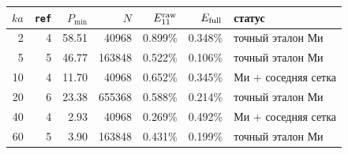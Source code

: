 \begin{tabular}{rrrrrrl}
\toprule
$ka$ & \texttt{ref} & $P_{\min}$ & $N$ & $E_{11}^{\rm raw}$ & $E_{\rm full}$ & статус\\
\midrule
2 & 4 & 58.51 & 40968 & 0.899\% & 0.348\% & точный эталон Ми\\
5 & 5 & 46.77 & 163848 & 0.522\% & 0.106\% & точный эталон Ми\\
10 & 4 & 11.70 & 40968 & 0.652\% & 0.345\% & Ми + соседняя сетка\\
20 & 6 & 23.38 & 655368 & 0.588\% & 0.214\% & точный эталон Ми\\
40 & 4 & 2.93 & 40968 & 0.269\% & 0.492\% & Ми + соседняя сетка\\
60 & 5 & 3.90 & 163848 & 0.431\% & 0.199\% & точный эталон Ми\\
\bottomrule
\end{tabular}
